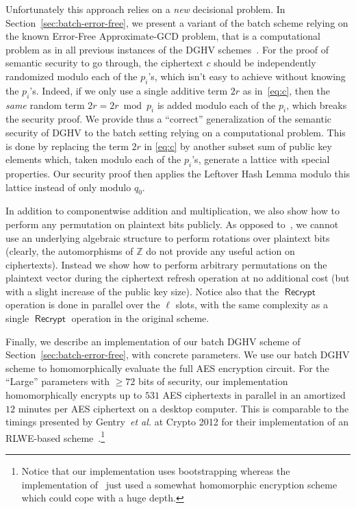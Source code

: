 \documentclass[11pt]{llncs}
\newcommand{\etal}{\textsl{et al.}\xspace}
\renewcommand\geq\geqslant
\newcommand{\Z}{{\mathbb Z}}
\DeclareMathOperator{\Recrypt}{\ensuremath{\mathsf{Recrypt}}}
\begin{document}
Unfortunately this approach relies on a \emph{new} decisional problem. In Section~\ref{sec:batch-error-free}, we present a variant of the batch scheme relying on the known Error-Free Approximate-GCD problem, that is a computational problem as in all previous instances of the DGHV schemes~\cite{vDGHV2010,CMNT2011,CNT2012}. For the proof of semantic security to go through, the ciphertext $c$
should be independently randomized modulo each of the $p_i$'s, which isn't easy to achieve without knowing the $p_i$'s. Indeed, if we only use a single additive term $2r$ as in~\eqref{eq:c}, then the \emph{same} random term $2r=2r \bmod p_i$ is added modulo each of the $p_i$, which breaks the security proof. We provide thus a ``correct'' generalization of the semantic security of DGHV to the batch setting relying on a computational problem. This is
done by replacing the term $2r$ in
\eqref{eq:c} by another subset sum of public key elements which, taken
modulo each of the $p_i$'s, generate a lattice with special properties.
Our security proof then applies the Leftover Hash Lemma modulo this
lattice instead of only modulo $q_0$.

In addition to componentwise addition and multiplication, we also show
how to perform any permutation on plaintext bits publicly. As opposed
to~\cite{BGV2012,GHS2012a}, we cannot use an underlying algebraic
structure to perform rotations over plaintext bits (clearly, the
automorphisms of $\Z$ do not provide any useful action on ciphertexts).
Instead we show how to perform arbitrary permutations on the plaintext
vector during the ciphertext refresh operation at no additional cost (but with
a slight increase of the public key size). Notice also that the $\Recrypt$
operation is done in parallel over the 
$\ell$ slots, with the same complexity as a single $\Recrypt$
operation in the original scheme.

Finally, we describe an implementation of our batch DGHV scheme of Section~\ref{sec:batch-error-free}, with
concrete parameters. We use our batch DGHV scheme to homomorphically
evaluate the full AES encryption circuit. For the ``Large'' parameters
with $\geq72$ bits of security, our implementation  homomorphically
encrypts up to  $531$ AES ciphertexts in parallel in an amortized $12$
minutes per AES ciphertext on a desktop computer. This is comparable to
the timings presented by Gentry~\etal at Crypto 2012 for their
implementation of an RLWE-based scheme~\cite{GHS2012c}.\footnote{
Notice that our implementation uses bootstrapping whereas the implementation
of~\cite{GHS2012c} just used a somewhat homomorphic encryption scheme which
could cope with a huge depth. }
\end{document}
